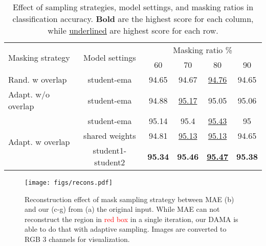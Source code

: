 \documentclass[10pt,twocolumn,letterpaper]{article}
\begin{document}
\begin{table}[]
\centering
\footnotesize
\begin{tabular}{|l|c|cccc|}
\hline
\multirow{2}{*}{Masking strategy}      & \multirow{2}{*}{Model settings} & \multicolumn{4}{c|}{Masking ratio \%}                                                                                                  \\ \cline{3-6} 
                                      &                             & \multicolumn{1}{c|}{60}             & \multicolumn{1}{c|}{70}             & \multicolumn{1}{c|}{80}                   & 90             \\ \hline
Rand. w overlap                       & student-ema                 & \multicolumn{1}{c|}{94.65}          & \multicolumn{1}{c|}{94.67}          & \multicolumn{1}{c|}{\underline{94.76}}          & 94.65          \\ \hline
Adapt. w/o overlap               & student-ema                 & \multicolumn{1}{c|}{94.88}          & \multicolumn{1}{c|}{\underline{95.17}}    & \multicolumn{1}{c|}{95.05}                & 95.06          \\ \hline
\multirow{3}{*}{Adapt. w overlap} & student-ema                 & \multicolumn{1}{c|}{95.14}          & \multicolumn{1}{c|}{95.4}           & \multicolumn{1}{c|}{\underline{95.43}}          & 95             \\ \cline{2-6} 
                                      & shared weights              & \multicolumn{1}{c|}{94.81}          & \multicolumn{1}{c|}{\underline{95.13}}    & \multicolumn{1}{c|}{\underline{95.13}}          & 94.65          \\ \cline{2-6} 
                                      & student1-student2           & \multicolumn{1}{c|}{\textbf{95.34}} & \multicolumn{1}{c|}{\textbf{95.46}} & \multicolumn{1}{c|}{\underline{\textbf{95.47}}} & \textbf{95.38} \\ \hline
\end{tabular}
\caption{Effect of sampling strategies, model settings, and masking ratios in classification accuracy. \textbf{Bold} are the highest score for each column, while \underline{underlined} are highest score for each row.\label{tab:abl}}
\vspace{-5pt}
\end{table}
\begin{figure}[]
\centering
\texttt{[image: figs/recons.pdf]}
\caption{Reconstruction effect of mask sampling strategy between MAE (b) and our (c-g) from (a) the original input. While MAE can not reconstruct the region in \textcolor{red}{red box} in a single iteration, our DAMA is able to do that with adaptive sampling. Images are converted to RGB 3 channels for visualization.}
\label{fig:recons}
\end{figure}
\end{document}
